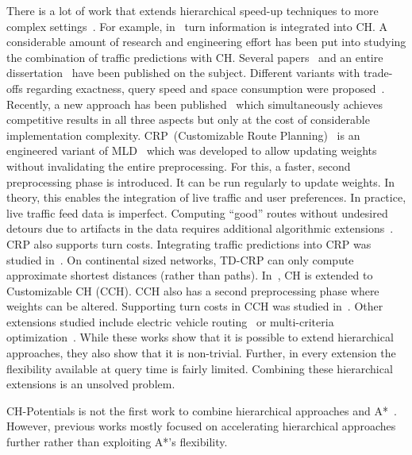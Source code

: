 \documentclass[a4paper,UKenglish,cleveref, autoref, thm-restate]{lipics-v2021}
\begin{document}
There is a lot of work that extends hierarchical speed-up techniques to more complex settings~\cite{bdgmpsww-rptn-16}.
For example, in~\cite{gv-errnt-11} turn information is integrated into CH.
A considerable amount of research and engineering effort has been put into studying the combination of traffic predictions with CH.
Several papers~\cite{bdsv-tdch-09,bgns-tdcha-10,klsv-dtdch-10,bgsv-mtdtt-13} and an entire dissertation~\cite{b-tdrpc-14} have been published on the subject.
Different variants with trade-offs regarding exactness, query speed and space consumption were proposed~\cite{bgsv-mtdtt-13}.
Recently, a new approach has been published~\cite{swz-sfert-20} which simultaneously achieves competitive results in all three aspects but only at the cost of considerable implementation complexity.
%
CRP~(Customizable Route Planning)~\cite{dgpw-crprn-13} is an engineered variant of MLD~\cite{swz-umlgt-02} which was developed to allow updating weights without invalidating the entire preprocessing.
For this, a faster, second preprocessing phase is introduced.
It can be run regularly to update weights.
In theory, this enables the integration of live traffic and user preferences.
In practice, live traffic feed data is imperfect.
Computing ``good'' routes without undesired detours due to artifacts in the data requires additional algorithmic extensions~\cite{dss-tarrn-18}.
CRP also supports turn costs.
Integrating traffic predictions into CRP was studied in~\cite{bdpw-dtdrp-16}.
On continental sized networks, TD-CRP can only compute approximate shortest distances (rather than paths).
%
In~\cite{dsw-cch-15}, CH is extended to Customizable CH (CCH).
CCH also has a second preprocessing phase where weights can be altered.
Supporting turn costs in CCH was studied in~\cite{bwzz-cchtc-20}.
Other extensions studied include electric vehicle routing~\cite{DBLP:journals/algorithmica/BaumDPSWZ20,DBLP:conf/aaai/EisnerFS11} or multi-criteria optimization~\cite{fns-opca-14,gks-rpfof-10}.
%
While these works show that it is possible to extend hierarchical approaches, they also show that it is non-trivial.
Further, in every extension the flexibility available at query time is fairly limited.
Combining these hierarchical extensions is an unsolved problem.

CH-Potentials is not the first work to combine hierarchical approaches and A*~\cite{bdsssw-chgds-10,gkw-blwr-07,bdgwz-sfpcs-19}.
However, previous works mostly focused on accelerating hierarchical approaches further rather than exploiting A*'s flexibility.
\end{document}

